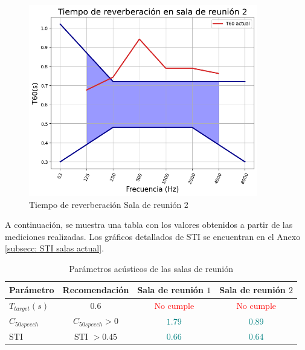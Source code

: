     \begin{figure}[H]
        \centering
        \includegraphics[width=10cm]{Imagenes/DIN/DIN sala reunion 2 actual.png}
        \caption{Tiempo de reverberación Sala de reunión 2}
        \label{fig:Ttarget sala de reunion 2}
    \end{figure}
A continuación, se muestra una tabla con los valores obtenidos a partir de las mediciones realizadas. Los gráficos detallados de STI se encuentran en el Anexo \ref{subsecc: STI salas actual}.
    \begin{table}[H]
        \centering
        \begin{tabular}{|l|c|c|c|}
        \hline
          \textbf{Parámetro}  & \textbf{Recomendación} & \textbf{Sala de reunión $1$} & \textbf{Sala de reunión $2$}\\ \hline
          $T_{target} (s)$    & $0.6$ & \textcolor{red}{No cumple} & \textcolor{red}{No cumple}\\ \hline
          $C_{50speech}$      & $C_{50speech}>0$ & \textcolor{teal}{$1.79$} & \textcolor{teal}{$0.89$} \\ \hline
          STI & STI $> 0.45$  & \textcolor{teal}{$0.66$} & \textcolor{teal}{$0.64$}\\\hline
        \end{tabular}
        \caption{Parámetros acústicos de las salas de reunión}
        \label{tab: cumplimiento parametros RT salas de reuniones}
    \end{table}
